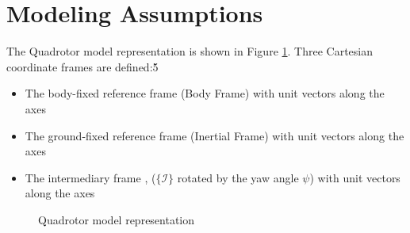 \section{Modeling Assumptions} 
The Quadrotor model representation is shown in Figure \ref{fig:mod.model}. Three Cartesian coordinate frames are defined:\v{5}
\begin{itemize}
	\setlength\itemsep{.2pt}
	\item The body-fixed reference frame  (Body Frame)
	\subitem with unit vectors  along the axes
	\item The ground-fixed reference frame  (Inertial Frame)
	\subitem with unit vectors  along the axes								
	\item The intermediary frame , ($ \{\mathcal{I} \}$ rotated by the yaw angle $ \psi $) 
	\subitem with unit vectors  along the axes								
\end{itemize}

\begin{figure}[h!]
	\centering
	\caption{Quadrotor model representation\label{fig:mod.model}}
\end{figure}	

